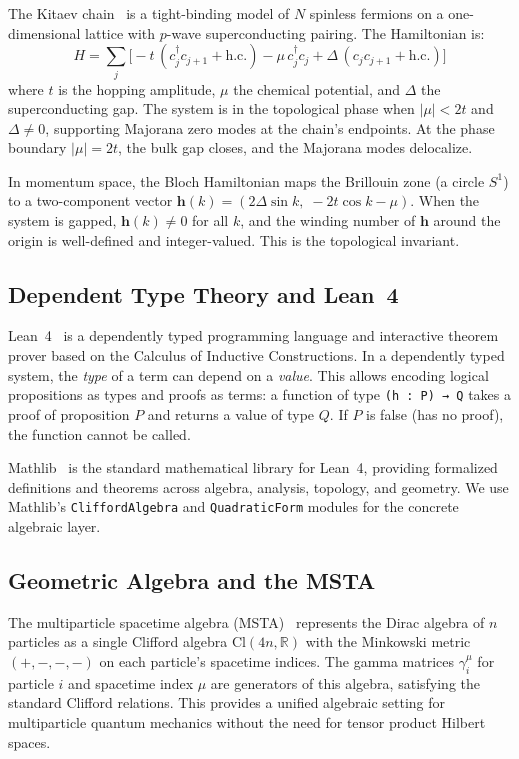 \documentclass[11pt,a4paper]{article}
\newcommand{\lean}[1]{\lstinline[language=Lean4]{#1}}
\begin{document}
The Kitaev chain~\cite{Kitaev2001} is a tight-binding model of $N$ spinless fermions on a one-dimensional lattice with $p$-wave superconducting pairing. The Hamiltonian is:
\begin{equation}
    H = \sum_j \bigl[ -t\,(c_j^\dagger c_{j+1} + \text{h.c.}) - \mu\, c_j^\dagger c_j + \Delta\,(c_j c_{j+1} + \text{h.c.}) \bigr]
\end{equation}
where $t$ is the hopping amplitude, $\mu$ the chemical potential, and $\Delta$ the superconducting gap. The system is in the topological phase when $|\mu| < 2t$ and $\Delta \neq 0$, supporting Majorana zero modes at the chain's endpoints. At the phase boundary $|\mu| = 2t$, the bulk gap closes, and the Majorana modes delocalize.

In momentum space, the Bloch Hamiltonian maps the Brillouin zone (a circle $S^1$) to a two-component vector $\mathbf{h}(k) = (2\Delta \sin k,\; -2t \cos k - \mu)$. When the system is gapped, $\mathbf{h}(k) \neq 0$ for all $k$, and the winding number of $\mathbf{h}$ around the origin is well-defined and integer-valued. This is the topological invariant.

\subsection{Dependent Type Theory and Lean~4}

Lean~4~\cite{deMoura2021} is a dependently typed programming language and interactive theorem prover based on the Calculus of Inductive Constructions. In a dependently typed system, the \emph{type} of a term can depend on a \emph{value}. This allows encoding logical propositions as types and proofs as terms: a function of type \lean{(h : P) → Q} takes a proof of proposition $P$ and returns a value of type $Q$. If $P$ is false (has no proof), the function cannot be called.

Mathlib~\cite{Mathlib2020} is the standard mathematical library for Lean~4, providing formalized definitions and theorems across algebra, analysis, topology, and geometry. We use Mathlib's \lean{CliffordAlgebra} and \lean{QuadraticForm} modules for the concrete algebraic layer.

\subsection{Geometric Algebra and the MSTA}

The multiparticle spacetime algebra (MSTA)~\cite{Doran2003} represents the Dirac algebra of $n$ particles as a single Clifford algebra $\mathrm{Cl}(4n, \mathbb{R})$ with the Minkowski metric $(+,-,-,-)$ on each particle's spacetime indices. The gamma matrices $\gamma_i^\mu$ for particle $i$ and spacetime index $\mu$ are generators of this algebra, satisfying the standard Clifford relations. This provides a unified algebraic setting for multiparticle quantum mechanics without the need for tensor product Hilbert spaces.
\end{document}
